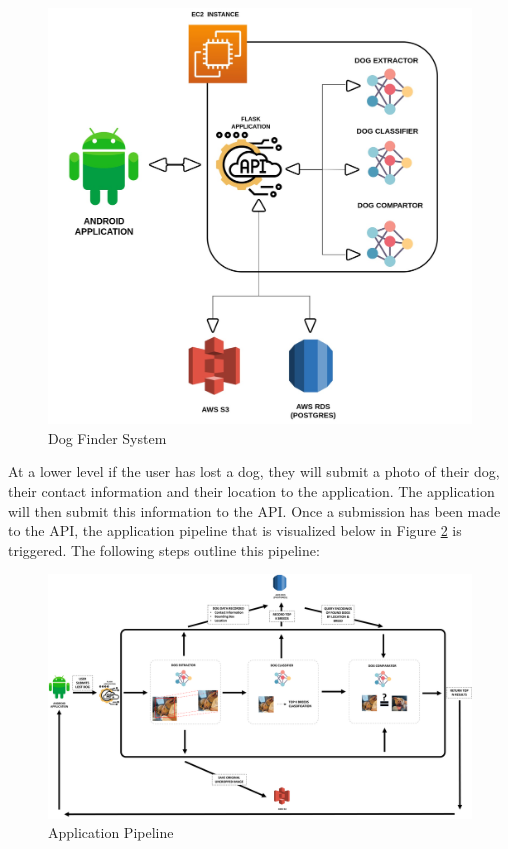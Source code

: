 \documentclass{article}
\begin{document}
\begin{figure}[h]
\centering
	\includegraphics[scale=0.1]{final-report-images/system.jpeg}
\caption{Dog Finder System}
\label{fig:x app system}
\end{figure}

At a lower level if the user has lost a dog, they will submit a photo of their dog, their contact information and their location to the application.  The application will then submit this information to the API.  Once a submission has been made to the API, the application pipeline that is visualized below in Figure \ref{fig:x app pipeline} is triggered.  The following steps outline this pipeline:

\newpage

\begin{figure}[h]
\centering
	\includegraphics[width=1.0\textwidth]{final-report-images/applowlevel.png}
\caption{Application Pipeline}
\label{fig:x app pipeline}
\end{figure}
\end{document}
